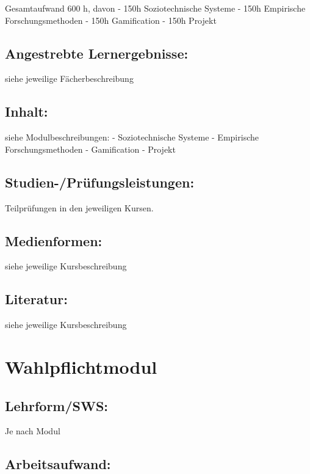 Gesamtaufwand 600 h, davon - 150h Soziotechnische Systeme - 150h
Empirische Forschungsmethoden - 150h Gamification - 150h Projekt

\section{Angestrebte
Lernergebnisse:}\label{angestrebte-lernergebnisse-31}

siehe jeweilige Fächerbeschreibung

\section{Inhalt:}\label{inhalt-31}

siehe Modulbeschreibungen: - Soziotechnische Systeme - Empirische
Forschungsmethoden - Gamification - Projekt

\section{Studien-/Prüfungsleistungen:}\label{studien-pruxfcfungsleistungen-31}

Teilprüfungen in den jeweiligen Kursen.

\section{Medienformen:}\label{medienformen-31}

siehe jeweilige Kursbeschreibung

\section{Literatur:}\label{literatur-31}

siehe jeweilige Kursbeschreibung

\chapter{Wahlpflichtmodul}\label{wahlpflichtmodul}

\section{Lehrform/SWS:}\label{lehrformsws-32}

Je nach Modul

\section{Arbeitsaufwand:}\label{arbeitsaufwand-31}

